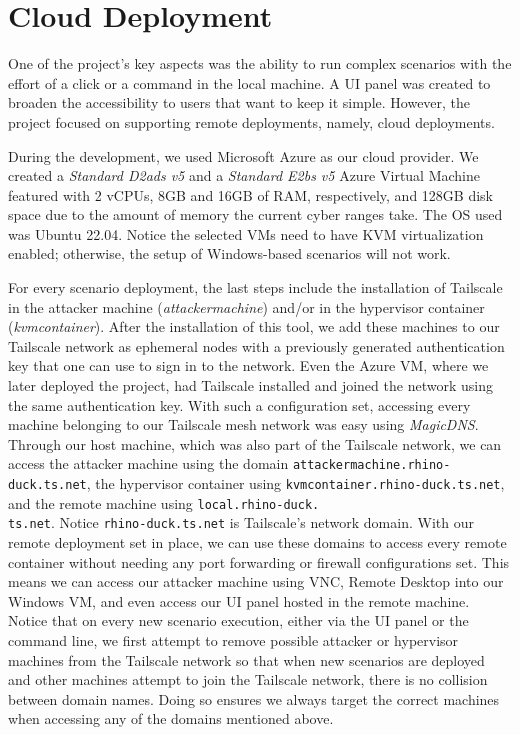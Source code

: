 
\section{Cloud Deployment} \label{sec:validation_cloud_deployment}

One of the project's key aspects was the ability to run complex scenarios with the effort of a click or a command in the local machine. A UI panel was created to broaden the accessibility to users that want to keep it simple. However, the project focused on supporting remote deployments, namely, cloud deployments.

During the development, we used Microsoft Azure as our cloud provider. We created a \textit{Standard D2ads v5} and a \textit{Standard E2bs v5} Azure Virtual Machine featured with 2 vCPUs, 8GB and 16GB of RAM, respectively, and 128GB disk space due to the amount of memory the current cyber ranges take. The OS used was Ubuntu 22.04. Notice the selected VMs need to have KVM virtualization enabled; otherwise, the setup of Windows-based scenarios will not work.

For every scenario deployment, the last steps include the installation of Tailscale in the attacker machine (\textit{attackermachine}) and/or in the hypervisor container (\textit{kvmcontainer}). After the installation of this tool, we add these machines to our Tailscale network as ephemeral nodes with a previously generated authentication key that one can use to sign in to the network. Even the Azure VM, where we later deployed the project, had Tailscale installed and joined the network using the same authentication key. With such a configuration set, accessing every machine belonging to our Tailscale mesh network was easy using \textit{MagicDNS}. Through our host machine, which was also part of the Tailscale network, we can access the attacker machine using the domain \texttt{attackermachine.rhino-duck.ts.net}, the hypervisor container using \texttt{kvmcontainer.rhino-duck.ts.net}, and the remote machine using \texttt{local.rhino-duck.\\ts.net}. Notice \texttt{rhino-duck.ts.net} is Tailscale's network domain. With our remote deployment set in place, we can use these domains to access every remote container without needing any port forwarding or firewall configurations set. This means we can access our attacker machine using VNC, Remote Desktop into our Windows VM, and even access our UI panel hosted in the remote machine. Notice that on every new scenario execution, either via the UI panel or the command line, we first attempt to remove possible attacker or hypervisor machines from the Tailscale network so that when new scenarios are deployed and other machines attempt to join the Tailscale network, there is no collision between domain names. Doing so ensures we always target the correct machines when accessing any of the domains mentioned above.

